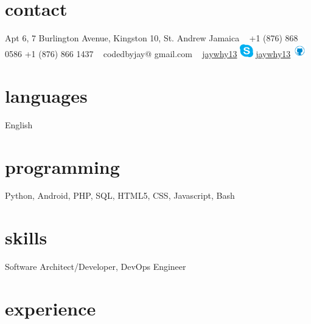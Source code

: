 \documentclass[]{cv-style}          %
\begin{document}

\lastupdated


\begin{aside}
%
\section{contact}
Apt 6, 
7 Burlington Avenue,
Kingston 10,
St. Andrew
Jamaica
~
+1 (876) 868 0586
+1 (876) 866 1437
~
codedbyjay@
gmail.com
~
\href {skype://jaywhy13}{jaywhy13} \includegraphics[height=16pt]{img/skype.png}
\href {http://github.com/jaywhy13}{jaywhy13} \includegraphics[height=16pt]{img/github.png}
%
\section{languages}
English
%
\section{programming}
Python, Android, PHP, SQL, HTML5, CSS, Javascript, Bash
%
\end{aside}


\section{skills}
  \vspace{-0.2cm}

Software Architect/Developer, DevOps Engineer


\section{experience}
\end{document}
